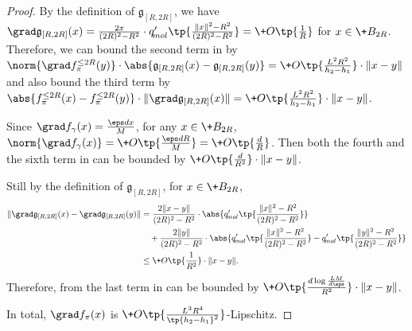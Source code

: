 \begin{proof}
    By the definition of $\mathfrak{g}_{[R,2R]}$, we have $\grad \mathfrak{g}_{[R,2R]}(x) = \frac{2x}{(2R)^2 - R^2} \cdot q'_{\!{mol}}\tp{\frac{\|x\|^2 - R^2}{(2R)^2 - R^2}} = \+O\tp{\frac{1}{R}}$ for $x\in \+B_{2R}$. Therefore, we can bound the second term in  by $\norm{\grad f^{\le 2R}_\pi(y)}\cdot \abs{\mathfrak{g}_{[R,2R]}(x) - \mathfrak{g}_{[R,2R]}(y)} = \+O\tp{\frac{L^2R^2}{h_2-h_1}}\cdot \|x-y\|$ and also bound the third term by $\abs{f^{\le 2R}_\pi(x) - f^{\le 2R}_\pi(y)}\cdot \|\grad \mathfrak{g}_{[R,2R]}(x)\| = \+O\tp{\frac{L^2R^2}{h_2-h_1}}\cdot \|x-y\|$. 

    Since $\grad f_{\gamma}(x) = \frac{\eps d x}{M}$, for any $x\in \+B_{2R}$, $\norm{\grad f_{\gamma}(x)} = \+O\tp{\frac{\eps d R }{M}}= \+O\tp{\frac{d }{R}}$. Then both the fourth and the sixth term in  can be bounded by $\+O\tp{\frac{d }{R^2}}\cdot \|x-y\|$.

    Still by the definition of $\mathfrak{g}_{[R,2R]}$, for $x\in \+B_{2R}$,
    \begin{align*}
        \|\grad \mathfrak{g}_{[R,2R]}(x) - \grad \mathfrak{g}_{[R,2R]}(y)\| &= \frac{2\|x-y\|}{(2R)^2 - R^2} \cdot \abs{q'_{\!{mol}}\tp{\frac{\|x\|^2 - R^2}{(2R)^2 - R^2}}} \\
        &\quad + \frac{2\|y\|}{(2R)^2 - R^2} \cdot \abs{q'_{\!{mol}}\tp{\frac{\|x\|^2 - R^2}{(2R)^2 - R^2}} - q'_{\!{mol}}\tp{\frac{\|y\|^2 - R^2}{(2R)^2 - R^2}}} \\
        &\leq \+O\tp{\frac{1}{R^2}}\cdot \|x-y\|.
    \end{align*}
    Therefore, from  the last term in  can be bounded by  $\+O\tp{\frac{d\log \frac{LM}{d\eps}}{R^2}}\cdot \|x-y\|$.

    In total, $\grad f_\pi(x)$ is $ \+O\tp{\frac{L^3R^4}{\tp{h_2-h_1}^2}}$-Lipschitz.
\end{proof}

